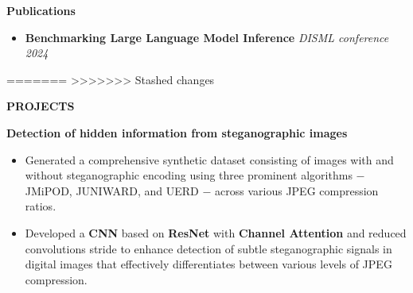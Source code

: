 \documentclass[10pt,a4]{article}
\begin{document}
{\begin{flushleft}
        
        \vspace{1mm}
        {\large \textbf{Publications}} \\
        \vspace{0.5mm}
        \begin{itemize}
            \item \textbf{Benchmarking Large Language Model Inference} \hfill \textit{DISML conference 2024}
        \end{itemize}
\end{flushleft}
=======
>>>>>>> Stashed changes

\begin{flushleft}
    {\Large \textbf{PROJECTS}}
    \vspace{1mm}
    \item \textbf{\large Detection of hidden information from steganographic images}
        \vspace{0.5mm}
        \begin{itemize}
            \item Generated a comprehensive synthetic dataset consisting of images with and without steganographic encoding using three prominent algorithms $-$ JMiPOD, JUNIWARD, and UERD $-$ across various JPEG compression ratios.
            \item Developed a \textbf{CNN} based on \textbf{ResNet} with \textbf{Channel Attention} and reduced convolutions stride to enhance detection of subtle steganographic signals in digital images that effectively differentiates between various levels of JPEG compression.
            
        \end{itemize}


\end{flushleft}}
\end{document}
